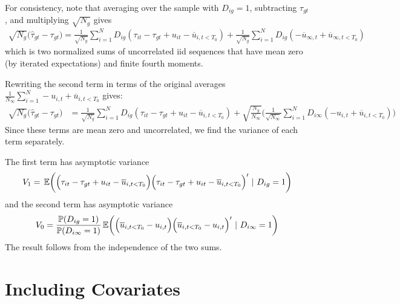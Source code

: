 \documentclass[12pt]{article}
\begin{document}
For consistency, note that averaging over the sample with $D_{ig} = 1$, subtracting $\tau_{gt}$, and multiplying $\sqrt{N_{g}}$ gives
\begin{align}
    \sqrt{N_{g}} \big( \widehat{\tau}_{gt} - \tau_{gt} \big) 
    = \frac{1}{\sqrt{N_{g}}}\sum_{i=1}^N D_{ig} (\tau_{it} - \tau_{gt} + u_{it} - \overline{u}_{i,t < T_0})
    + \frac{1}{\sqrt{N_{g}}}\sum_{i = 1}^N D_{ig} (- \overline{u}_{\infty,t} + \overline{u}_{\infty,t < T_0}) 
\end{align}
which is two normalized sums of uncorrelated iid sequences that have mean zero (by iterated expectations) and finite fourth moments. %

Rewriting the second term in terms of the original averages $\frac{1}{N_\infty} \sum_{i=1}^N - u_{i,t} + \overline{u}_{i,t < T_0}$ gives:
\begin{align}
    \sqrt{N_{g}} \big( \widehat{\tau}_{gt} - \tau_{gt} \big) 
    &= \frac{1}{\sqrt{N_{g}}}\sum_{i=1}^N D_{ig} (\tau_{it} - \tau_{gt} + u_{it} - \overline{u}_{i,t < T_0})
    + \sqrt{\frac{N_g}{N_\infty}} \bigg ( \frac{1}{\sqrt{N_\infty}} \sum_{i = 1}^N D_{i\infty} (- u_{i,t} + \overline{u}_{i,t < T_0} ) \bigg)
\end{align}
Since these terms are mean zero and uncorrelated, we find the variance of each term separately. 

The first term has asymptotic variance 
\begin{equation}
V_1 = \expec{\Big( \tau_{it} - \tau_{gt} + u_{it} - \overline{u}_{i,t < T_0} \Big) \Big( \tau_{it} - \tau_{gt} + u_{it} - \overline{u}_{i,t < T_0} \Big)'}{D_{ig} = 1}
\end{equation}
and the second term has asymptotic variance
\begin{equation}
V_0 = \frac{\mathbb{P}(D_{ig} = 1)}{\mathbb{P}(D_{i\infty} = 1)} \expec{ \Big( \overline{u}_{i,t < T_0} - u_{i,t} \Big) \Big( \overline{u}_{i,t < T_0} - u_{i,t} \Big)' }{D_{i\infty} = 1}
\end{equation}
The result follows from the independence of the two sums.




\section{Including Covariates}
\end{document}
